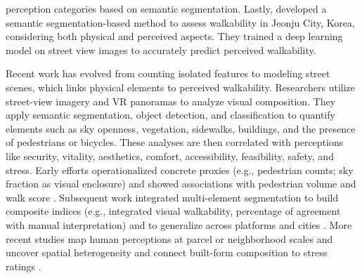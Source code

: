 \documentclass[11pt]{article}
\begin{document}
perception categories based on semantic segmentation. Lastly, \citet{kang2023assessment} developed a semantic segmentation-based method to assess walkability in Jeonju City, Korea, considering both physical and perceived aspects. They trained a deep learning model on street view images to accurately predict perceived walkability. 


Recent work has evolved from counting isolated features to modeling street scenes, which links physical elements to perceived walkability. Researchers utilize street-view imagery and VR panoramas to analyze visual composition. They apply semantic segmentation, object detection, and classification to quantify elements such as sky openness, vegetation, sidewalks, buildings, and the presence of pedestrians or bicycles. These analyses are then correlated with perceptions like security, vitality, aesthetics, comfort, accessibility, feasibility, safety, and stress. Early efforts operationalized concrete proxies (e.g., pedestrian counts; sky fraction as visual enclosure) and showed associations with pedestrian volume and walk score \citep{ki2023novel}. Subsequent work integrated multi-element segmentation to build composite indices (e.g., integrated visual walkability, percentage of agreement with manual interpretation) and to generalize across platforms and cities \citep{wang2024investigating}. More recent studies map human perceptions at parcel or neighborhood scales and uncover spatial heterogeneity and connect built-form composition to stress ratings \citep{lei2024evaluating}. 


\end{document}
